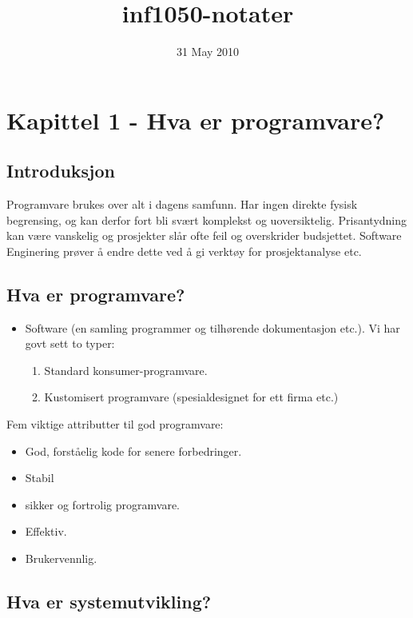 \documentclass[11pt]{article}
\title{inf1050-notater}
\date{31 May 2010}
\begin{document}
\maketitle

\setcounter{tocdepth}{3}
\tableofcontents
\vspace*{1cm}
\section{Kapittel 1 - Hva er programvare?}
\label{sec-1}
\subsection{Introduksjon}
\label{sec-1.1}

  Programvare brukes over alt i dagens samfunn. Har ingen direkte fysisk begrensing, 
  og kan derfor fort bli svært komplekst og uoversiktelig. Prisantydning kan være 
  vanskelig og prosjekter slår ofte feil og overskrider budsjettet. Software Enginering 
  prøver å endre dette ved å gi verktøy for prosjektanalyse etc. 
\subsection{Hva er programvare?}
\label{sec-1.2}

\begin{itemize}
\item Software (en samling programmer og tilhørende dokumentasjon etc.).
     Vi har govt sett to typer:

\begin{enumerate}
\item Standard konsumer-programvare.
\item Kustomisert programvare (spesialdesignet for ett firma etc.)
\end{enumerate}

\end{itemize}

  Fem viktige attributter til god programvare: 
\begin{itemize}
\item God, forståelig kode for senere forbedringer.
\item Stabil
\item sikker og fortrolig programvare.
\item Effektiv.
\item Brukervennlig.
\end{itemize}
\subsection{Hva er systemutvikling?}
\label{sec-1.3}
\end{document}
